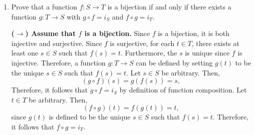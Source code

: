 \begin{enumerate}
\begin{enumerate}
\begin{subprove}
      Since \(f\) and \(g\) are bijective, they are both injective and surjective.
      It will be proved that \(g \circ f\) is both injective and surjective.\proofstep
      Let \(x_{1}, x_{2} \in S\) be such that \((g \circ f)(x_{1}) = (g \circ f)(x_{2})\).
      By the definition of function composition, \(g(f(x_{1})) = g(f(x_{2}))\).
      Since \(g\) is injective, it follows that \(f(x_{1}) = f(x_{2})\).
      Since \(f\) is injective, it follows that \(x_{1} = x_{2}\).
      Therefore, \(g \circ f\) is injective.\proofstep
      Let \(u \in U\) be arbitrary.
      Since \(g\) is surjective, there exists \(t \in T\) such that \(g(t) = u\).
      Since \(f\) is surjective, there exists \(s \in S\) such that \(f(s) = t\).
      Therefore, \((g \circ f)(s) = g(f(s)) = g(t) = u\).
      Since \(u\) was arbitrary, it follows that \(g \circ f\) is surjective.\proofstep
      Since \(g \circ f\) is both injective and surjective, it follows that \(g \circ f\) is bijective.
    \end{subprove}
  \end{enumerate}
  \item Prove that a function \(f: S \to T\) is a bijection if and only if 
  there exists a function \(g: T \to S\) with \(g \circ f = i_{S}\) and \(f \circ g = i_{T}\).
  \begin{subprove}
    \textbf{($\rightarrow$) Assume that \(f\) is a bijection.}
    Since \(f\) is a bijection, it is both injective and surjective.
    Since \(f\) is surjective, for each \(t \in T\), 
    there exists at least one \(s \in S\) such that \(f(s) = t\).
    Furthermore, the \(s\) is unique since \(f\) is injective.
    Therefore, a function \(g: T \to S\) can be defined by setting \(g(t)\) to be the unique \(s \in S\) such that \(f(s) = t\).
    Let \(s \in S\) be arbitrary.
    Then,
    \[
    (g \circ f)(s) = g(f(s)) = s,
    \]
    Therefore, it follows that \(g \circ f = i_{S}\) by definition of function composition.\proofstep
    Let \(t \in T\) be arbitrary.
    Then,
    \[
    (f \circ g)(t) = f(g(t)) = t,
    \]
    since \(g(t)\) is defined to be the unique \(s \in S\) such that \(f(s) = t\).
    Therefore, it follows that \(f \circ g = i_{T}\).
    

\end{subprove}
\end{enumerate}
